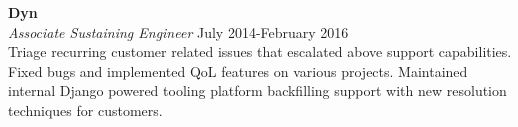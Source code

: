 \large{\textbf{Dyn}} \\
\textit{Associate Sustaining Engineer} \hfill July 2014-February 2016 \\[3.75pt]
Triage recurring customer related issues that escalated above support capabilities. Fixed bugs and implemented QoL features on various projects. Maintained internal Django powered tooling platform backfilling support with new resolution techniques for customers.
